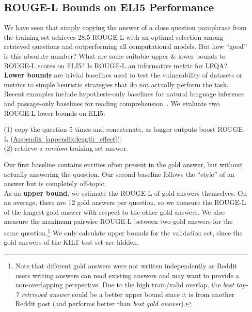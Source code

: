 \documentclass[11pt]{article}
\newcommand{\namedref}[2]{\hyperref[#2]{#1~\ref*{#2}}}
\newcommand{\appendixref}[1]{\namedref{Appendix}{#1}}
\begin{document}
\subsection{ROUGE-L Bounds on ELI5 Performance}
\label{sec:rougel_bounds}

We have seen that simply copying the answer of a close question paraphrase from the training set achieves 28.5 ROUGE-L with an optimal selection among retrieved questions and outperforming all computational models. But how ``good'' is this absolute number? What are some suitable upper \& lower bounds to ROUGE-L scores on ELI5? Is ROUGE-L an informative metric for LFQA?\\


\noindent \textbf{Lower bounds} are trivial baselines used to test the vulnerability of datasets or metrics to simple heuristic strategies that do not actually perform the task. Recent examples include hypothesis-only baselines for natural language inference~\citep{gururangan2018annotation} and passage-only baselines for reading comprehension~\citep{kaushik2018much}. We evaluate two ROUGE-L lower bounds on ELI5:

\noindent (1) copy the question 5 times and concatenate, as longer outputs boost ROUGE-L (\appendixref{appendix:length_effect}); \\
\noindent (2) retrieve a \textit{random} training set answer.

Our first baseline contains entities often present in the gold answer, but without actually answering the question. Our second baseline follows the ``style'' of an answer but is completely off-topic. \\

As an \textbf{upper bound}, we estimate the ROUGE-L of gold answers themselves. On an average, there are 12 gold answers per question, so we measure the ROUGE-L of the longest gold answer with respect to the other gold answers. We also measure the maximum pairwise ROUGE-L between two gold answers for the same question.\footnote{Note that different gold answers were not written independently as Reddit users writing answers can read existing answers and may want to provide a non-overlapping perspective. Due to the high train/valid overlap, the \emph{best top-7 retrieved answer} could be a better upper bound since it is from another Reddit post (and performs better than \emph{best gold answer}).
} We only calculate upper bounds for the validation set, since the gold answers of the KILT test set are hidden.\\
\end{document}
